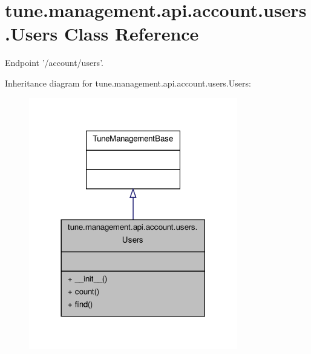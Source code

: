 \hypertarget{classtune_1_1management_1_1api_1_1account_1_1users_1_1Users}{\section{tune.\-management.\-api.\-account.\-users.\-Users Class Reference}
\label{classtune_1_1management_1_1api_1_1account_1_1users_1_1Users}
}


Endpoint '/account/users'.  




Inheritance diagram for tune.\-management.\-api.\-account.\-users.\-Users\-:
\nopagebreak
\begin{figure}[H]
\begin{center}
\leavevmode
\includegraphics[width=258pt]{classtune_1_1management_1_1api_1_1account_1_1users_1_1Users__inherit__graph}
\end{center}
\end{figure}


